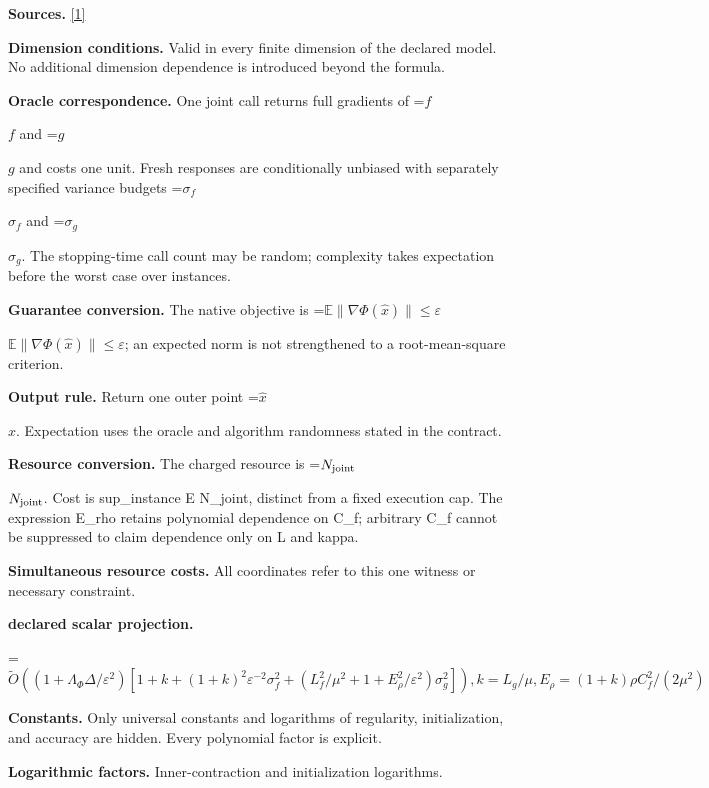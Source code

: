 \documentclass[10pt,a4paper]{article}
\newcommand{\AtlasMath}[1]{\par\begingroup\centering\setbox0=\hbox{$\displaystyle #1$}\ifdim\wd0>1.4\linewidth\typeout{ATLAS WIDE FORMULA: \the\wd0}\fi\ifdim\wd0>\linewidth\resizebox{\linewidth}{!}{\box0}\else\box0\fi\par\endgroup}
\newcommand{\AtlasInlineMath}[1]{\begingroup\setbox0=\hbox{$#1$}\ifdim\wd0>.4\linewidth\endgroup\AtlasMath{#1}\else\endgroup$#1$\fi}
\begin{document}
\textbf{Sources.} \href{https://arxiv.org/pdf/2610.03633v2}{[1]}



\textbf{Dimension conditions.} Valid in every finite dimension of the declared model. No additional dimension dependence is introduced beyond the formula.



\textbf{Oracle correspondence.} One joint call returns full gradients of \AtlasInlineMath{f} and \AtlasInlineMath{g} and costs one unit. Fresh responses are conditionally unbiased with separately specified variance budgets \AtlasInlineMath{\sigma_f} and \AtlasInlineMath{\sigma_g}. The stopping-time call count may be random; complexity takes expectation before the worst case over instances.



\textbf{Guarantee conversion.} The native objective is \AtlasInlineMath{\mathbb E\|\nabla\Phi(\widehat x)\|\le\varepsilon}; an expected norm is not strengthened to a root-mean-square criterion.



\textbf{Output rule.} Return one outer point \AtlasInlineMath{\widehat x}. Expectation uses the oracle and algorithm randomness stated in the contract.



\textbf{Resource conversion.} The charged resource is \AtlasInlineMath{N_{\rm joint}}. Cost is sup\_instance E N\_joint, distinct from a fixed execution cap. The expression E\_rho retains polynomial dependence on C\_f; arbitrary C\_f cannot be suppressed to claim dependence only on L and kappa.



\textbf{Simultaneous resource costs.} All coordinates refer to this one witness or necessary constraint.



\textbf{declared scalar projection.}



\AtlasMath{\widetilde O((1+\Lambda _\Phi \Delta /\varepsilon ^2)[1+k+(1+k)^2 \varepsilon ^{-2} {\sigma _f^2+(L_f^2/\mu ^2+1+E_\rho ^2/\varepsilon ^2)\sigma _g^2}]), k=L_g/\mu , E_\rho =(1+k)\rho  C_f^2/(2\mu ^2)}


\textbf{Constants.} Only universal constants and logarithms of regularity, initialization, and accuracy are hidden. Every polynomial factor is explicit.



\textbf{Logarithmic factors.} Inner-contraction and initialization logarithms.
\end{document}
